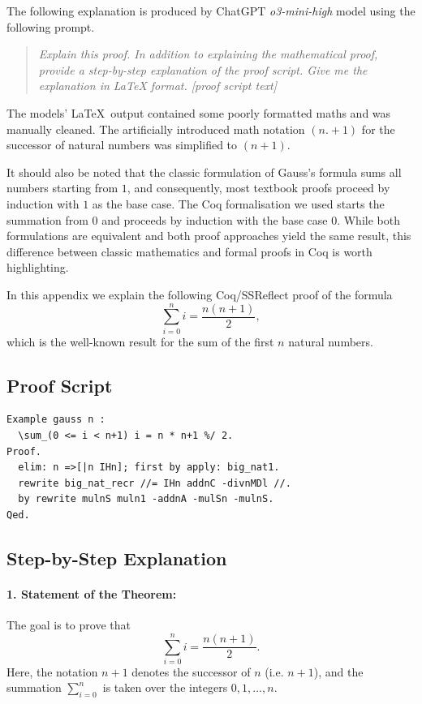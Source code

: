 \documentclass[10pt,nonacm,natbib=false]{acmart}
\begin{document}
The following explanation is produced by ChatGPT \textit{o3-mini-high}
model using the following prompt.

\begin{quotation}
  \textit{Explain this proof. In addition to explaining the
    mathematical proof, provide a step-by-step explanation of the
    proof script. Give me the explanation in LaTeX format. [proof script text]}

\end{quotation}

\noindent The models' \LaTeX\ output contained some poorly formatted
maths and was manually cleaned. The artificially introduced math
notation $(n.+1)$ for the successor of natural numbers was simplified
to $(n+1)$.

It should also be noted that the classic formulation of Gauss's
formula sums all numbers starting from $1$, and consequently, most
textbook proofs proceed by induction with $1$ as the base case. The
Coq formalisation we used starts the summation from $0$ and proceeds
by induction with the base case $0$. While both formulations are
equivalent and both proof approaches yield the same result, this
difference between classic mathematics and formal proofs in Coq is
worth highlighting.

\noindent\hdashrule[0.5ex]{\textwidth}{1pt}{1pt}

In this appendix we explain the following Coq/SSReflect proof of the formula
\[
\sum_{i=0}^ {n} i = \frac{n(n+1)}{2},
\]
which is the well-known result for the sum of the first \( n \) natural numbers.

\subsection*{Proof Script}
\begin{lstlisting}
Example gauss n :
  \sum_(0 <= i < n+1) i = n * n+1 %/ 2.
Proof.
  elim: n =>[|n IHn]; first by apply: big_nat1.
  rewrite big_nat_recr //= IHn addnC -divnMDl //.
  by rewrite mulnS muln1 -addnA -mulSn -mulnS.
Qed.
\end{lstlisting}

\subsection*{Step-by-Step Explanation}

\paragraph{1. Statement of the Theorem:}
The goal is to prove that
\[
\sum_{i=0}^{n} i = \frac{n(n+1)}{2}.  
\]
Here, the notation \( n+1 \) denotes the successor of \( n \) (i.e. \( n+1 \)), and the summation \(\sum_{i=0}^{n}\) is taken over the integers \( 0, 1, \dots, n \).
\end{document}
